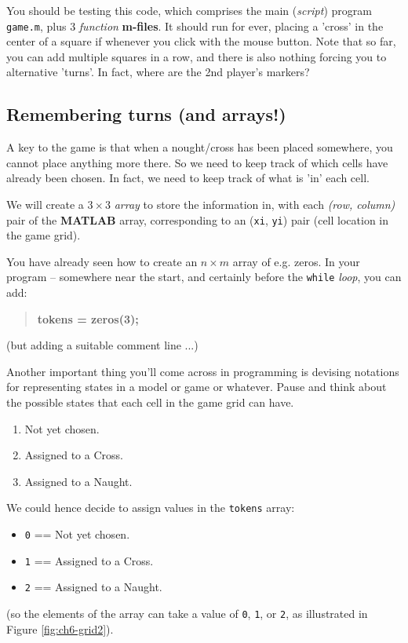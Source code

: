 \documentclass{tufte-book} %
\newenvironment{docspecbold}{\begin{quotation}\ttfamily\bfseries\parskip0pt\parindent0pt\ignorespaces}{\end{quotation}}
\begin{document}
You should be testing this code, which comprises the main (\textit{script}) program \texttt{game.m}, plus 3 \textit{function} \textbf{m-files}. It should run for ever, placing a 'cross' in the center of a square if whenever you click with the  mouse button. Note that so far, you can add multiple squares in a row, and there is also nothing forcing you to alternative 'turns'.  In fact, where are the 2nd player's markers?


\subsection{Remembering turns (and arrays!)}

A key to the game is that when a nought/cross has been placed somewhere, you cannot place anything more there. So we need to keep track of which cells have already been chosen. In fact, we need to keep track of what is 'in' each cell.

We will create a \(3\times3\) \textit{array} to store the information in, with each \textit{(row, column)} pair of the \textbf{MATLAB} array, corresponding to an (\texttt{xi}, \texttt{yi}) pair (cell location in the game grid).

You have already seen how to create an \(n\times m\) array of e.g. zeros. In your program -- somewhere near the start, and certainly before the \texttt{while} \textit{loop}, you can add:
\begin{docspecbold}
tokens = zeros(3);
\end{docspecbold}
(but adding a suitable comment line ...)

Another important thing you'll come across in programming is devising notations for representing states in a model or game or whatever. Pause and think about the possible states that each cell in the game grid can have.
\begin{enumerate}[noitemsep]
\item Not yet chosen.
\item Assigned to a Cross.
\item Assigned to a Naught.
\end{enumerate}
We could hence decide to assign values in the \texttt{tokens} array:
\begin{itemize}[noitemsep]
\item[] \texttt{0} == Not yet chosen.
\item[] \texttt{1} == Assigned to a Cross.
\item[] \texttt{2} == Assigned to a Naught.
\end{itemize}
(so the elements of the array can take a value of \texttt{0}, \texttt{1}, or \texttt{2}, as illustrated in Figure \ref{fig:ch6-grid2}).
\end{document}
